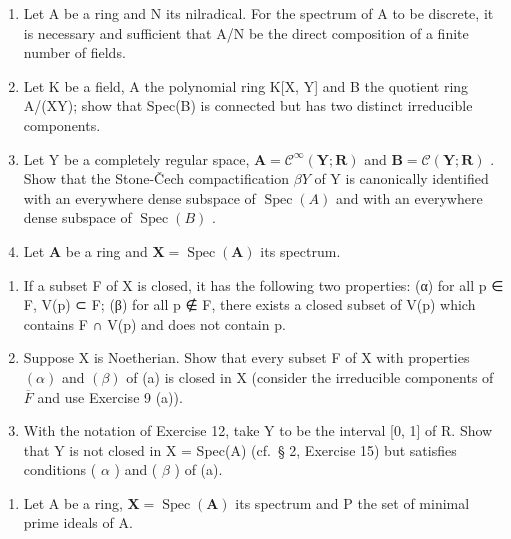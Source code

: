 \begin{enumerate}
\def\labelenumi{\arabic{enumi}.}
\setcounter{enumi}{9}
\item
  Let A be a ring and N its nilradical. For the spectrum of A to be discrete, it is necessary and sufficient that A/N be the direct composition of a finite number of fields.
\item
  Let K be a field, A the polynomial ring K{[}X, Y{]} and B the quotient ring A/(XY); show that Spec(B) is connected but has two distinct irreducible components.
\item
  Let Y be a completely regular space, \(\mathbf{A} = \mathcal{C}^{\infty}(\mathbf{Y}; \mathbf{R})\) and \(\mathbf{B} = \mathcal{C}(\mathbf{Y}; \mathbf{R})\) . Show that the Stone-Čech compactification \(\beta Y\) of Y is canonically identified with an everywhere dense subspace of \(\operatorname{Spec}(A)\) and with an everywhere dense subspace of \(\operatorname{Spec}(B)\) .
\item
  Let \(\mathbf{A}\) be a ring and \(\mathbf{X} = \operatorname{Spec}(\mathbf{A})\) its spectrum.
\end{enumerate}

\begin{enumerate}
\def\labelenumi{(\alph{enumi})}
\item
  If a subset F of X is closed, it has the following two properties: (α) for all p ∈ F, V(p) ⊂ F; (β) for all p ∉ F, there exists a closed subset of V(p) which contains F ∩ V(p) and does not contain p.
\item
  Suppose X is Noetherian. Show that every subset F of X with properties \((\alpha)\) and \((\beta)\) of (a) is closed in X (consider the irreducible components of \(\overline{F}\) and use Exercise 9 (a)).
\item
  With the notation of Exercise 12, take Y to be the interval {[}0, 1{]} of R. Show that Y is not closed in X = Spec(A) (cf.~§ 2, Exercise 15) but satisfies conditions ( \(\alpha\) ) and ( \(\beta\) ) of (a).
\end{enumerate}

\begin{enumerate}
\def\labelenumi{\arabic{enumi}.}
\setcounter{enumi}{13}
\tightlist
\item
  Let A be a ring, \(\mathbf{X} = \operatorname{Spec}(\mathbf{A})\) its spectrum and P the set of minimal prime ideals of A.
\end{enumerate}

